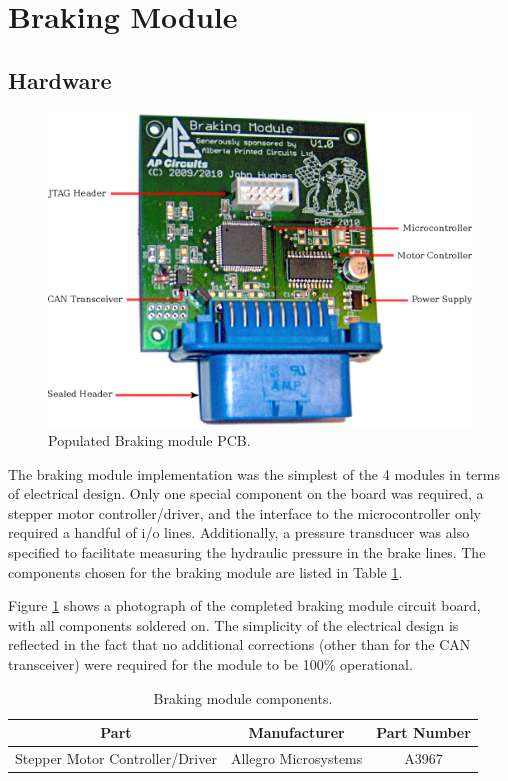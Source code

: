 \section{Braking Module}

\subsection{Hardware}

\begin{figure}[h]
\centering
\includegraphics[scale=1]{implementation/figures/braking_pcb}
\caption{Populated Braking module PCB.}
\label{fig:braking_pcb}
\end{figure}

The braking module implementation was the simplest of the 4 modules in terms of electrical design. Only one special component on the board was required, a stepper motor controller/driver, and the interface to the microcontroller only required a handful of i/o lines. Additionally, a pressure transducer was also specified to facilitate measuring the hydraulic pressure in the brake lines. The components chosen for the braking module are listed in Table \ref{table:braking_module_components}.

Figure \ref{fig:braking_pcb} shows a photograph of the completed braking module circuit board, with all components soldered on. The simplicity of the electrical design is reflected in the fact that no additional corrections (other than for the CAN transceiver) were required for the module to be 100\% operational.

\begin{table}
  \caption{Braking module components.\label{table:braking_module_components}}
  \centering
  \begin{tabular}{|c|c|c|}
    \hline 
    Part & Manufacturer & Part Number\tabularnewline 
    \hline \hline
    Stepper Motor Controller/Driver & Allegro Microsystems & A3967 \tabularnewline
    \hline
  \end{tabular}
\end{table}

